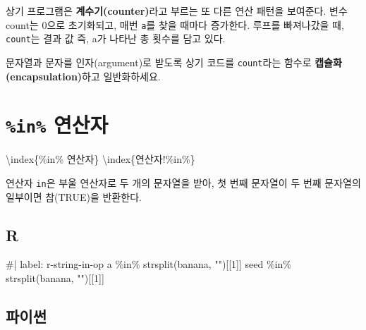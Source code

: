 \documentclass[
  letterpaper,
]{book}
\newenvironment{Shaded}{\begin{snugshade}}{\end{snugshade}}
\newcommand{\NormalTok}[1]{\textcolor[rgb]{0.00,0.23,0.31}{#1}}
\begin{document}
상기 프로그램은 \textbf{계수기(counter)}라고 부르는 또 다른 연산 패턴을
보여준다. 변수 count는 0으로 초기화되고, 매번 \texttt{a}를 찾을 때마다
증가한다. 루프를 빠져나갔을 때, \texttt{count}는 결과 값 즉, a가 나타난
총 횟수를 담고 있다.

\begin{tcolorbox}[enhanced jigsaw, coltitle=black, breakable, opacityback=0, colback=white, bottomtitle=1mm, titlerule=0mm, toptitle=1mm, title=\textcolor{quarto-callout-warning-color}{\faExclamationTriangle}\hspace{0.5em}{연습문제}, left=2mm, rightrule=.15mm, colframe=quarto-callout-warning-color-frame, bottomrule=.15mm, leftrule=.75mm, toprule=.15mm, arc=.35mm, colbacktitle=quarto-callout-warning-color!10!white, opacitybacktitle=0.6]

문자열과 문자를 인자(argument)로 받도록 상기 코드를 \texttt{count}라는
함수로 \textbf{캡슐화(encapsulation)}하고 일반화하세요. 

\end{tcolorbox}

\section{\texorpdfstring{\texttt{\%in\%}
연산자}{\%in\% 연산자}}\label{r-string-in-operator}

\textbackslash index\{\%in\% 연산자\}
\textbackslash index\{연산자!\%in\%\} 

연산자 \texttt{in}은 부울 연산자로 두 개의 문자열을 받아, 첫 번째
문자열이 두 번째 문자열의 일부이면 참(TRUE)을 반환한다.

\subsection{R}

\begin{Shaded}
\begin{Highlighting}[]
\NormalTok{\#| label: r{-}string{-}in{-}op}
\NormalTok{\textquotesingle{}a\textquotesingle{} \%in\% strsplit(\textquotesingle{}banana\textquotesingle{}, "")[[1]]}
\NormalTok{\textquotesingle{}seed\textquotesingle{} \%in\% strsplit(\textquotesingle{}banana\textquotesingle{}, "")[[1]]}
\end{Highlighting}
\end{Shaded}

\subsection{파이썬}
\end{document}
